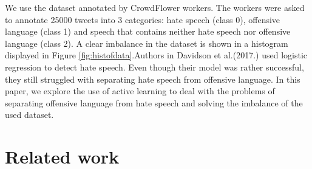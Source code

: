\documentclass[10pt, a4paper]{article}
\begin{document}
We use the dataset annotated by CrowdFlower workers. The workers were asked to annotate 25000 tweets into 3 categories: hate speech (class 0), offensive language (class 1) and speech that contains neither hate speech nor offensive language (class 2). A clear imbalance in the dataset is shown in a histogram displayed in Figure \ref{fig:histofdata}.Authors in Davidson et al.(2017.) used logistic regression to detect hate speech. Even though their model was rather successful, they still struggled with separating hate speech from offensive language. In this paper, we explore the use of active learning to deal with the problems of separating offensive language from hate speech and solving the imbalance of the used dataset.


\section{Related work}
\end{document}
